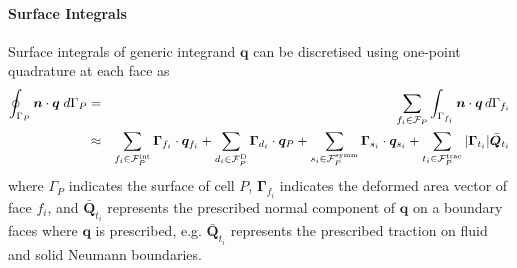 \documentclass[sn-mathphys,Numbered]{sn-jnl}%
\newcommand{\bb}{\boldsymbol}
\begin{document}
\paragraph{Surface Integrals}
Surface integrals of generic integrand $\bb{q}$ can be discretised using one-point quadrature at each face as
\begin{eqnarray} \label{eq:diffusion_discret}
	\oint_{\Gamma_P} \bb{n} \cdot \bb{q}  \; d\Gamma_P
	&=& \sum_{f_i \in \mathcal{F}_P} \int_{\Gamma_{f_i}} \bb{n} \cdot \bb{q}  \,  d \Gamma_{f_i} \notag \\
	&\approx&
	\sum_{f_i \in \mathcal{F}_P^{\text{int}}} \bb{\Gamma}_{f_i} \cdot \bb{q}_{f_i}
	+ \sum_{d_i \in \mathcal{F}_P^{\text{D}}} \bb{\Gamma}_{d_i} \cdot \bb{q}_{P}
	+ \sum_{s_i \in \mathcal{F}_P^{\text{symm}}} \bb{\Gamma}_{s_i} \cdot \bb{q}_{s_i}
	+ \sum_{t_i \in \mathcal{F}_P^{\text{trac}}} |\bb{\Gamma}_{t_i}| \bar{\bb{Q}}_{t_i}
\end{eqnarray}
where $\Gamma_P$ indicates the surface of cell $P$, $\bb{\Gamma}_{f_i}$ indicates the deformed area vector of face $f_i$, and $\bar{\bb{Q}}_{t_i}$ represents the prescribed normal component of $\bb{q}$ on a boundary faces where $\bb{q}$ is prescribed, e.g. $\bar{\bb{Q}}_{t_i}$ represents the prescribed traction on fluid and solid Neumann boundaries.
\end{document}
